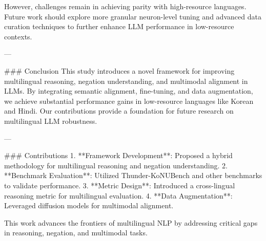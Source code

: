 However, challenges remain in achieving parity with high-resource languages. Future work should explore more granular neuron-level tuning and advanced data curation techniques to further enhance LLM performance in low-resource contexts.

---

### Conclusion
This study introduces a novel framework for improving multilingual reasoning, negation understanding, and multimodal alignment in LLMs. By integrating semantic alignment, fine-tuning, and data augmentation, we achieve substantial performance gains in low-resource languages like Korean and Hindi. Our contributions provide a foundation for future research on multilingual LLM robustness.

---

### Contributions
1. **Framework Development**: Proposed a hybrid methodology for multilingual reasoning and negation understanding.
2. **Benchmark Evaluation**: Utilized Thunder-KoNUBench and other benchmarks to validate performance.
3. **Metric Design**: Introduced a cross-lingual reasoning metric for multilingual evaluation.
4. **Data Augmentation**: Leveraged diffusion models for multimodal alignment.

This work advances the frontiers of multilingual NLP by addressing critical gaps in reasoning, negation, and multimodal tasks.